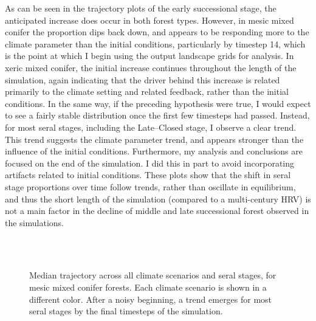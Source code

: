 As can be seen in the trajectory plots of the early successional stage, the anticipated increase does occur in both forest types. However, in mesic mixed conifer the proportion dips back down, and appears to be responding more to the climate parameter than the initial conditions, particularly by timestep 14, which is the point at which I begin using the output landscape grids for analysis. In xeric mixed conifer, the initial increase continues throughout the length of the simulation, again indicating that the driver behind this increase is related primarily to the climate setting and related feedback, rather than the initial conditions. In the same way, if the preceding hypothesis were true, I would expect to see a fairly stable distribution once the first few timesteps had passed. Instead, for most seral stages, including the Late--Closed stage, I observe a clear trend. This trend suggests the climate parameter trend, and appears stronger than the influence of the initial conditions. Furthermore, my analysis and conclusions are focused on the end of the simulation. I did this in part to avoid incorporating artifacts related to initial conditions. These plots show that the shift in seral stage proportions over time follow trends, rather than oscillate in equilibrium, and thus the short length of the simulation (compared to a multi-century HRV) is not a main factor in the decline of middle and late successional forest observed in the simulations.

\begin{figure}[htbp]
 \captionsetup[subfigure]{labelformat=empty}
  \centering
  \\%
   \\
    \caption{Median trajectory across all climate scenarios and seral stages, for mesic mixed conifer forests. Each climate scenario is shown in a different color. After a noisy beginning, a trend emerges for most seral stages by the final timesteps of the simulation.}
  \label{fig:median_trajectory_smcm}
\end{figure} 


